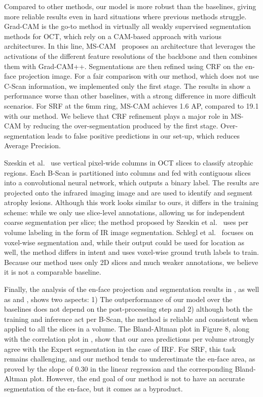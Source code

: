 Compared to other methods, our model is more robust than the baselines, giving more reliable results even in hard situations where previous methods struggle. Grad-CAM is the go-to method in virtually all weakly supervised segmentation methods for OCT, which rely on a CAM-based approach with various architectures. In this line, MS-CAM~ proposes an architecture that leverages the activations of the different feature resolutions of the backbone and then combines them with Grad-CAM++. Segmentations are then refined using CRF on the en-face projection image. For a fair comparison with our method, which does not use C-Scan information, we implemented only the first stage. The results in  show a performance worse than other baselines, with a strong difference in more difficult scenarios. For SRF at the 6mm ring, MS-CAM achieves 1.6 AP, compared to 19.1 with our method. We believe that CRF refinement plays a major role in MS-CAM by reducing the over-segmentation produced by the first stage. Over-segmentation leads to false positive predictions in our set-up, which reduces Average Precision.

Szeskin et al.~ use vertical pixel-wide columns in OCT slices to classify atrophic regions. Each B-Scan is partitioned into columns and fed with contiguous slices into a convolutional neural network, which outputs a binary label. The results are projected onto the infrared imaging image and are used to identify and segment atrophy lesions. Although this work looks similar to ours, it differs in the training scheme: while we only use slice-level annotations, allowing us for independent coarse segmentation per slice; the method proposed by Szeskin et al.~ uses per volume labeling in the form of IR image segmentation.
Schlegl et al.~ focuses on voxel-wise segmentation and, while their output could be used for location as well, the method differs in intent and uses voxel-wise ground truth labels to train. Because our method uses only 2D slices and much weaker annotations, we believe it is not a comparable baseline.

Finally, the analysis of the en-face projection and segmentation results in , as well as  and , shows two aspects: 1) The outperformance of our model over the baselines does not depend on the post-processing step and 2) although both the training and inference act per B-Scan, the method is reliable and consistent when applied to all the slices in a volume. The Bland-Altman plot in Figure 8, along with the correlation plot in , show that our area predictions per volume strongly agree with the Expert segmentation in the case of IRF. For SRF, this task remains challenging, and our method tends to underestimate the en-face area, as proved by the slope of 0.30 in the linear regression and the corresponding Bland-Altman plot. However, the end goal of our method is not to have an accurate segmentation of the en-face, but it comes as a byproduct.

